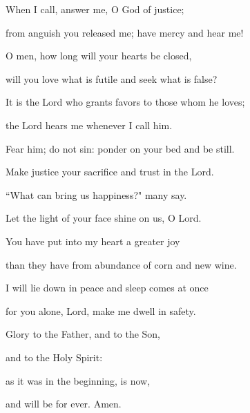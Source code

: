 \noindent  When I call, answer me, O God of justice;~\GreStar{}~\nopagebreak

from anguish you released me; have mercy and hear me!

\noindent O men, how long will your hearts be closed,~\GreStar{}~\nopagebreak

will you love what is futile and seek what is false?

\noindent It is the Lord who grants favors to those whom he loves;~\GreStar{}~\nopagebreak

the Lord hears me whenever I call him.

\noindent Fear him; do not sin: ponder on your bed and be still.~\GreStar{}~\nopagebreak

Make justice your sacrifice and trust in the Lord.

\noindent ``What can bring us happiness?" many say.~\GreStar{}~\nopagebreak

Let the light of your face shine on us, O Lord.

\noindent You have put into my heart a greater joy~\GreStar{}~\nopagebreak

than they have from abundance of corn and new wine.

\noindent I will lie down in peace and sleep comes at once~\GreStar{}~\nopagebreak

for you alone, Lord, make me dwell in safety.

\noindent Glory to the Father, and to the Son,~\GreStar{}~\nopagebreak

and to the Holy Spirit:

\noindent as it was in the beginning, is now,~\GreStar{}~\nopagebreak

and will be for ever. Amen.
